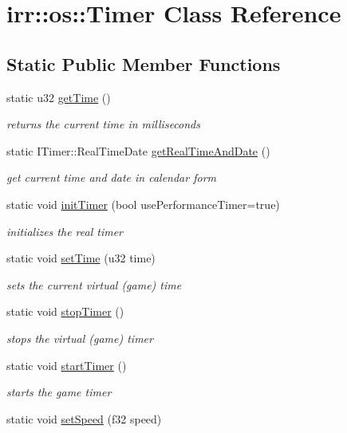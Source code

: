\hypertarget{classirr_1_1os_1_1_timer}{\section{irr\-:\-:os\-:\-:Timer Class Reference}
\label{classirr_1_1os_1_1_timer}
}
\subsection*{Static Public Member Functions}
\begin{DoxyCompactItemize}
\item 
static u32 \hyperlink{classirr_1_1os_1_1_timer_a640377de088feab25b5b83f8d4ecc50d}{get\-Time} ()
\begin{DoxyCompactList}\small\item\em returns the current time in milliseconds \end{DoxyCompactList}\item 
static I\-Timer\-::\-Real\-Time\-Date \hyperlink{classirr_1_1os_1_1_timer_a8b9af561cd8d4cb865c9b559b09eafb5}{get\-Real\-Time\-And\-Date} ()
\begin{DoxyCompactList}\small\item\em get current time and date in calendar form \end{DoxyCompactList}\item 
\hypertarget{classirr_1_1os_1_1_timer_afd3a551dbfa6d8a35dbcc37bc4ed8ebf}{static void \hyperlink{classirr_1_1os_1_1_timer_afd3a551dbfa6d8a35dbcc37bc4ed8ebf}{init\-Timer} (bool use\-Performance\-Timer=true)}\label{classirr_1_1os_1_1_timer_afd3a551dbfa6d8a35dbcc37bc4ed8ebf}

\begin{DoxyCompactList}\small\item\em initializes the real timer \end{DoxyCompactList}\item 
static void \hyperlink{classirr_1_1os_1_1_timer_aca64b292f9ea26d331684cde33e521da}{set\-Time} (u32 time)
\begin{DoxyCompactList}\small\item\em sets the current virtual (game) time \end{DoxyCompactList}\item 
static void \hyperlink{classirr_1_1os_1_1_timer_ad2639d4bb96c4aee882bd7770b074919}{stop\-Timer} ()
\begin{DoxyCompactList}\small\item\em stops the virtual (game) timer \end{DoxyCompactList}\item 
static void \hyperlink{classirr_1_1os_1_1_timer_a0b9574ae0da8b6ee743bb25f425ea745}{start\-Timer} ()
\begin{DoxyCompactList}\small\item\em starts the game timer \end{DoxyCompactList}\item 
\hypertarget{classirr_1_1os_1_1_timer_a99651492b15c71c904d70595df0cbdf2}{static void \hyperlink{classirr_1_1os_1_1_timer_a99651492b15c71c904d70595df0cbdf2}{set\-Speed} (f32 speed)}\label{classirr_1_1os_1_1_timer_a99651492b15c71c904d70595df0cbdf2}


\end{DoxyCompactItemize}

